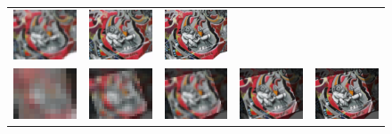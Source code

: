 \begin{figure}[h]
\begin{center}
\begin{tabular}{c c c c c}
        \includegraphics[width=2.2cm]{main/chapter03/data/homography/img_dst_3.jpg} &
        \includegraphics[width=2.2cm]{main/chapter03/data/homography/img_dst_4.jpg} &
        \includegraphics[width=2.2cm]{main/chapter03/data/homography/img_dst_5.jpg} \\
        \includegraphics[width=2.2cm]{main/chapter03/data/homography/img_src_to_dst_1.jpg} &
        \includegraphics[width=2.2cm]{main/chapter03/data/homography/img_src_to_dst_2.jpg} &
        \includegraphics[width=2.2cm]{main/chapter03/data/homography/img_src_to_dst_3.jpg} &
        \includegraphics[width=2.2cm]{main/chapter03/data/homography/img_src_to_dst_4.jpg} &
        \includegraphics[width=2.2cm]{main/chapter03/data/homography/img_src_to_dst_5.jpg} \\

\end{tabular}
\end{center}
\end{figure}
